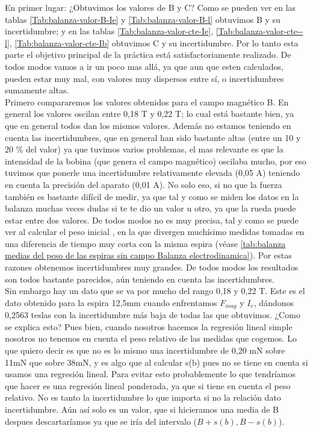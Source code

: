 \documentclass[12pt,a4paper]{book}
\begin{document}
En primer lugar: ¿Obtuvimos los valores de B y C? Como se pueden ver en las tablas \ref{Tab:balanza-valor-B-Ie} y \ref{Tab:balanza-valor-B-l} obtuvimos B y su incertidumbre; y en las tablas \ref{Tab:balanza-valor-cte-Ie}, \ref{Tab:balanza-valor-cte--l}, \ref{Tab:balanza-valor-cte-Ib}  obtuvimos C y su incertidumbre. Por lo tanto esta parte el objetivo principal de la práctica está satisfactoriamente realizado. De todos modos vamos a ir un poco mas allá, ya que aun que esten calculados, pueden estar muy mal, con valores muy dispersos entre sí, o incertidumbres sumamente altas. \\

Primero compararemos los valores obtenidos para el campo  magnético B. En general los valores oscilan entre 0,18 T y 0,22 T; lo cual está bastante bien, ya que en general todos dan los mismos valores. Además no estamos teniendo en cuenta las incertidumbres, que en general han sido bastante altas (entre un 10 y 20 \% del valor) ya que tuvimos varios problemas, el mas relevante es que la intensidad de la bobina (que genera el campo magnético) oscilaba mucho, por eso tuvimos que ponerle una incertidumbre relativamente elevada (0,05 A) teniendo en cuenta la precisión del aparato (0,01 A). No solo eso, si no que la fuerza también es bastante difícil de medir, ya que tal y como se miden los datos en la balanza muchas veces dudas si te te dio un valor u otro, ya que la rueda puede estar entre dos valores. De todos modos no es muy precisa, tal y como se puede ver al calcular el peso inicial , en la que divergen muchísimo medidas tomadas en una diferencia de tiempo muy corta con la misma espira (véase \ref{tab:balanza medias del peso de las espiras sin campo Balanza electrodinamica}). Por estas razones obtenemos incertidumbres muy grandes. De todos modos los resultados son todos bastante parecidos, aún teniendo en cuenta las incertidumbres. \\

Sin embargo hay un dato que se va por mucho del rango 0,18 y 0,22 T. Este es el dato obtenido para la espira 12,5mm cuando enfrentamos $F_{mag}$ y $I_e$, dándonos 0,2563 teslas con la incertidumbre más baja de todas las que obtuvimos. ¿Como se explica esto? Pues bien, cuando nosotros hacemos la regresión lineal simple nosotros no tenemos en cuenta el peso relativo de las medidas que cogemos. Lo que quiero decir es que no es lo mismo una incertidumbre de 0,20 mN sobre 11mN que sobre 38mN, y es algo que al calcular s(b) pues no se tiene en cuenta si usamos una regresión lineal. Para evitar esto probablemente lo que tendríamos que hacer es una regresión lineal ponderada, ya que si tiene en cuenta el peso relativo. No es tanto la incertidumbre lo que importa si no la relación dato incertidumbre. Aún así solo es un valor, que si hicieramos una media de B despues descartaríamos ya que se iría del intervalo ($B+s(b), B-s(b)$).\\
\end{document}
